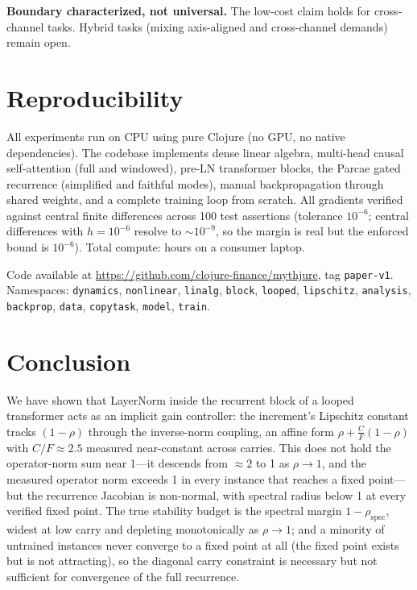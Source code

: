 \documentclass[11pt]{article}
\begin{document}
\textbf{Boundary characterized, not universal.} The low-cost claim holds for cross-channel tasks. Hybrid tasks (mixing axis-aligned and cross-channel demands) remain open.


\section{Reproducibility}
\label{sec:reproducibility}

All experiments run on CPU using pure Clojure (no GPU, no native dependencies). The codebase implements dense linear algebra, multi-head causal self-attention (full and windowed), pre-LN transformer blocks, the Parcae gated recurrence (simplified and faithful modes), manual backpropagation through shared weights, and a complete training loop from scratch. All gradients verified against central finite differences across 100 test assertions (tolerance $10^{-6}$; central differences with $h = 10^{-6}$ resolve to $\sim 10^{-9}$, so the margin is real but the enforced bound is $10^{-6}$). Total compute: hours on a consumer laptop.

Code available at \url{https://github.com/clojure-finance/mythjure}, tag \texttt{paper-v1}. Namespaces: \texttt{dynamics}, \texttt{nonlinear}, \texttt{linalg}, \texttt{block}, \texttt{looped}, \texttt{lipschitz}, \texttt{analysis}, \texttt{backprop}, \texttt{data}, \texttt{copytask}, \texttt{model}, \texttt{train}.


\section{Conclusion}

We have shown that LayerNorm inside the recurrent block of a looped transformer acts as an implicit gain controller: the increment's Lipschitz constant tracks $(1-\rho)$ through the inverse-norm coupling, an affine form $\rho + \tfrac{C}{F}(1-\rho)$ with $C/F \approx 2.5$ measured near-constant across carries. This does not hold the operator-norm sum near 1---it descends from $\approx 2$ to 1 as $\rho \to 1$, and the measured operator norm exceeds 1 in every instance that reaches a fixed point---but the recurrence Jacobian is non-normal, with spectral radius below 1 at every verified fixed point. The true stability budget is the spectral margin $1 - \rho_{\text{spec}}$, widest at low carry and depleting monotonically as $\rho \to 1$; and a minority of untrained instances never converge to a fixed point at all (the fixed point exists but is not attracting), so the diagonal carry constraint is necessary but not sufficient for convergence of the full recurrence.
\end{document}
